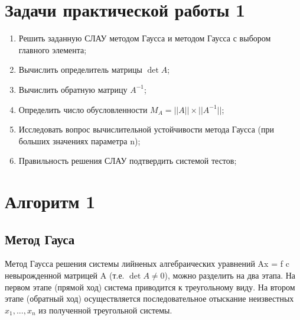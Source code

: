 \documentclass[a4paper,12pt,titlepage,finall]{article}
\begin{document}
\section{Задачи практической работы 1}
\begin{enumerate}
\item Решить заданную СЛАУ методом Гаусса и методом Гаусса с выбором главного элемента;
\item Вычислить определитель матрицы $\det{A}$;
\item Вычислить обратную матрицу $A^{-1}$;
\item Определить число обусловленности $M_{A}=||A|| \times ||A^{-1}||$;
\item Исследовать вопрос вычислительной устойчивости метода Гаусса (при больших значениях параметра n);
\item Правильность решения СЛАУ подтвердить системой тестов;

\end{enumerate}

\newpage

\section{Алгоритм 1}
\subsection{Метод Гауса}
Метод Гаусса решения системы лийненых алгебраических уравнений Ax = f c невырожденной матрицей A (т.е. $\det{A} \neq 0$), можно разделить на два этапа. На первом этапе
(прямой ход) система приводится к треугольному виду. На втором этапе (обратный ход) осуществляется последовательное отыскание неизвестных $x_{1}, ..., x_{n}$ из полученной треугольной системы.
\end{document}
